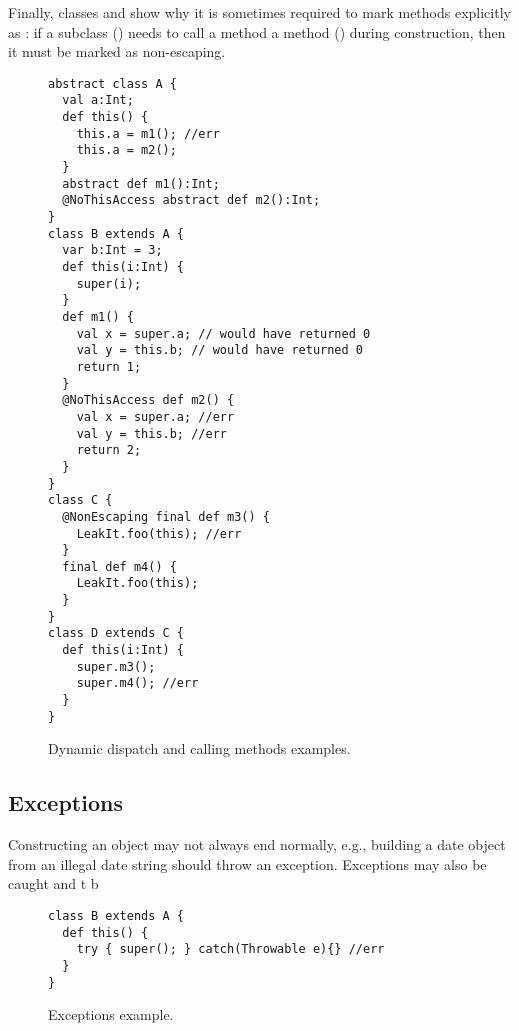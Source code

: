 Finally, classes  and  show why it is sometimes required to mark
    methods explicitly as :
    if a subclass () needs to call a method a method ()
    during construction, then it must be marked as non-escaping.


\begin{figure}
\begin{lstlisting}
abstract class A {
  val a:Int;
  def this() {
    this.a = m1(); //err
    this.a = m2();
  }
  abstract def m1():Int;
  @NoThisAccess abstract def m2():Int;
}
class B extends A {
  var b:Int = 3;
  def this(i:Int) {
    super(i);
  }
  def m1() {
    val x = super.a; // would have returned 0
    val y = this.b; // would have returned 0
    return 1;
  }
  @NoThisAccess def m2() {
    val x = super.a; //err
    val y = this.b; //err
    return 2;
  }
}
class C {
  @NonEscaping final def m3() {
    LeakIt.foo(this); //err
  }
  final def m4() {
    LeakIt.foo(this);
  }
}
class D extends C {
  def this(i:Int) {
    super.m3();
    super.m4(); //err
  }
}
\end{lstlisting}
\caption{Dynamic dispatch and calling  methods examples.
    }
\label{Figure:Dynamic-dispatch}
\end{figure}




\subsection{Exceptions}
Constructing an object may not always end normally,
    e.g., building a date object from an illegal date string should throw an exception.
Exceptions may also be caught and t
    b

\begin{figure}
\begin{lstlisting}
class B extends A {
  def this() {
    try { super(); } catch(Throwable e){} //err
  }
}
\end{lstlisting}
\caption{Exceptions example.
    }
\label{Figure:Exceptions}
\end{figure}

